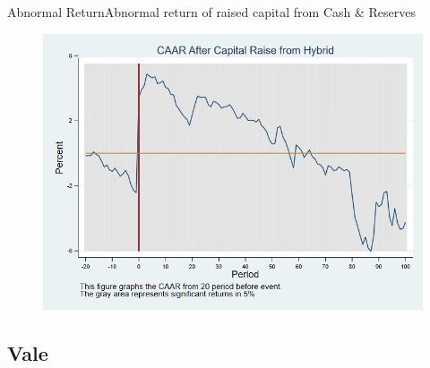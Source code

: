\documentclass{beamer}
\begin{document}
	\begin{frame}{Abnormal Return}{Abnormal return of raised capital from Cash \& Reserves}
		\label{abreturnhybrid}
		\begin{figure}
			\centering
			\includegraphics[width=0.65\linewidth]{Output/CARHybrid.png}
			\label{fig:abreturnhybrid}
		\end{figure}

	\end{frame}
	
	
	
	\subsection{Vale}
	
\end{document}
